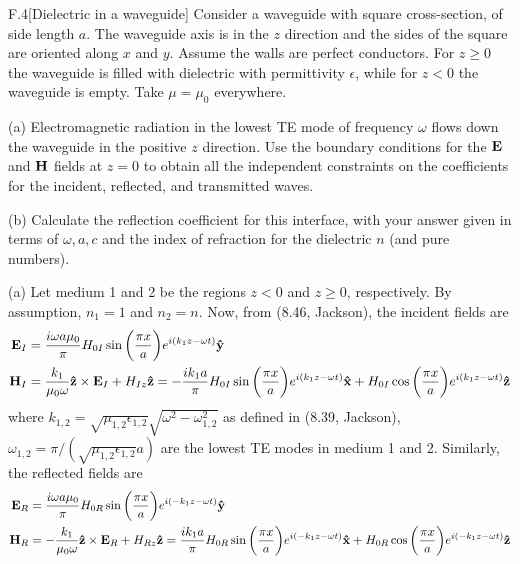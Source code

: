 \documentclass[12pt]{article}
\begin{document}
\begin{problem}{F.4}[Dielectric in a waveguide]
Consider a waveguide with square cross-section, of side length $a$. The
waveguide axis is in the $z$ direction and the sides of the square are oriented
along $x$ and $y$. Assume the walls are perfect conductors. For $z\geq 0$ the
waveguide is filled with dielectric with permittivity $\epsilon$, while for
$z<0$ the waveguide is empty. Take $\mu=\mu_0$ everywhere.

(a) Electromagnetic radiation in the lowest TE mode of frequency $\omega$ flows
down the waveguide in the positive $z$ direction. Use the boundary conditions
for the $\vb{E}$ and $\vb{H}$ fields at $z=0$ to obtain all the independent
constraints on the coefficients for the incident, reflected, and transmitted
waves.

(b) Calculate the reflection coefficient for this interface, with your answer
given in terms of $\omega,a,c$ and the index of refraction for the dielectric
$n$ (and pure numbers).
\begin{solution}
(a) Let medium 1 and 2 be the regions $z<0$ and $z\geq 0$, respectively.
By assumption, $n_1=1$ and $n_2=n$. Now, from (8.46, Jackson), the incident 
fields are
\begin{subequations}
    \begin{align}
        \vb{E}_I&=\frac{i\omega a\mu_0}{\pi}H_{0I}\sin\qty(\frac{\pi
        x}{a})e^{i(k_1z-\omega t)}\vb{\hat{y}}\\
        \vb{H}_I&=\frac{k_1}{\mu_0\omega}\vb{\hat{z}}\times\vb{E}_I+
        H_{Iz}\vb{\hat{z}}=
        -\frac{ik_1a}{\pi}H_{0I}\sin\qty(\frac{\pi x}{a})e^{i(k_1z-\omega
        t)}\vb{\hat{x}}+
        H_{0I}\cos\qty(\frac{\pi x}{a})e^{i(k_1z-\omega t)}\vb{\hat{z}}
    \end{align} 
\end{subequations}
where $k_{1,2}=\sqrt{\mu_{1,2}\epsilon_{1,2}}\sqrt{\omega^2-\omega_{1,2}^2}$ as
defined in (8.39, Jackson), $\omega_{1,2}=\pi/(\sqrt{\mu_{1,2}\epsilon_{1,2}}a)$
are the lowest TE modes in medium 1 and 2. Similarly, the reflected fields are
\begin{subequations}
    \begin{align}
        \vb{E}_R&=\frac{i\omega a\mu_0}{\pi}H_{0R}\sin\qty(\frac{\pi
        x}{a})e^{i(-k_1z-\omega t)}\yhat\\
        \vb{H}_R&=-\frac{k_1}{\mu_0\omega}\zhat\times\vb{E}_R+
        H_{Rz}\zhat=
        \frac{ik_1a}{\pi}H_{0R}\sin\qty(\frac{\pi x}{a})e^{i(-k_1z-\omega
        t)}\xhat+
        H_{0R}\cos\qty(\frac{\pi x}{a})e^{i(-k_1z-\omega t)}\zhat

\end{align}
\end{subequations}
\end{solution}
\end{problem}
\end{document}
